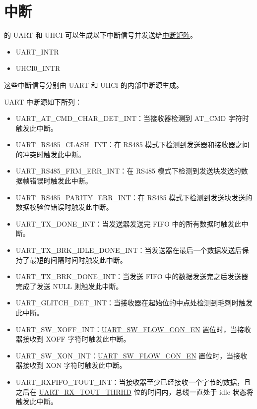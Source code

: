 \documentclass[main\_\_CN.tex]{subfiles}
\begin{document}
\section{中断}


\chipname{} 的 UART 和 UHCI 可以生成以下中断信号并发送给\hyperref[mod:intmtrx]{中断矩阵}。

    \begin{itemize}
        \item { UART\_INTR}
        \item { UHCI0\_INTR}
    \end{itemize}

这些中断信号分别由 UART 和 UHCI 的内部中断源生成。

UART 中断源如下所列：

\begin{itemize}
\item \label{int:UARTATCMDCHARDETINT}UART\_AT\_CMD\_CHAR\_DET\_INT：当接收器检测到 AT\_CMD 字符时触发此中断。
\item \label{int:UARTRS485CLASHINT}UART\_RS485\_CLASH\_INT：在 RS485 模式下检测到发送器和接收器之间的冲突时触发此中断。
\item \label{int:UARTRS485FRMERRINT}UART\_RS485\_FRM\_ERR\_INT：在 RS485 模式下检测到发送块发送的数据帧错误时触发此中断。
\item \label{int:UARTRS485PARITYERRINT}UART\_RS485\_PARITY\_ERR\_INT：在 RS485 模式下检测到发送块发送的数据校验位错误时触发此中断。
\item \label{int:UARTTXDONEINT}UART\_TX\_DONE\_INT：当发送器发送完 FIFO 中的所有数据时触发此中断。
\item \label{int:UARTTXBRKIDLEDONEINT}UART\_TX\_BRK\_IDLE\_DONE\_INT：当发送器在最后一个数据发送后保持了最短的间隔时间时触发此中断。
\item \label{int:UARTTXBRKDONEINT}UART\_TX\_BRK\_DONE\_INT：当发送 FIFO 中的数据发送完之后发送器完成了发送 NULL 则触发此中断。
\item \label{int:UARTGLITCHDETINT}UART\_GLITCH\_DET\_INT：当接收器在起始位的中点处检测到毛刺时触发此中断。
\item \label{int:UARTSWXOFFINT}UART\_SW\_XOFF\_INT：\hyperref[fielddesc:UARTSWFLOWCONEN]{UART\_SW\_FLOW\_CON\_EN} 置位时，当接收器接收到 XOFF 字符时触发此中断。
\item \label{int:UARTSWXONINT}UART\_SW\_XON\_INT：\hyperref[fielddesc:UARTSWFLOWCONEN]{UART\_SW\_FLOW\_CON\_EN} 置位时，当接收器接收到 XON 字符时触发此中断。
\item \label{int:UARTRXFIFOTOUTINT}UART\_RXFIFO\_TOUT\_INT：当接收器至少已经接收一个字节的数据，且之后在 \hyperref[fielddesc:UARTRXTOUTTHRHD]{UART\_RX\_TOUT\_THRHD} 位的时间内，总线一直处于 idle 状态将触发此中断。

\end{itemize}
\end{document}
